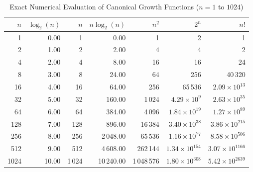 \documentclass[11pt,a4paper,oneside]{report}
\theoremstyle{definition}
\begin{document}
\begin{table}[htbp]
\centering
\caption{Exact Numerical Evaluation of Canonical Growth Functions ($n = 1$ to $1024$)}
\label{tab:numerical_growth_functions}
\small
\begin{tabular*}{\textwidth}{@{\extracolsep{\fill}}rrrrrrr}
\toprule
$n$ & $\log_2(n)$ & $n$ & $n \log_2(n)$ & $n^2$ & $2^n$ & $n!$ \\
\midrule
1    & 0.00  & 1     & 0.00     & 1           & 2                    & 1                    \\
2    & 1.00  & 2     & 2.00     & 4           & 4                    & 2                    \\
4    & 2.00  & 4     & 8.00     & 16          & 16                   & 24                   \\
8    & 3.00  & 8     & 24.00    & 64          & 256                  & 40\,320              \\
16   & 4.00  & 16    & 64.00    & 256         & 65\,536              & $2.09 \times 10^{13}$ \\
32   & 5.00  & 32    & 160.00   & 1\,024      & $4.29 \times 10^9$   & $2.63 \times 10^{35}$ \\
64   & 6.00  & 64    & 384.00   & 4\,096      & $1.84 \times 10^{19}$ & $1.27 \times 10^{89}$ \\
128  & 7.00  & 128   & 896.00   & 16\,384     & $3.40 \times 10^{38}$ & $3.86 \times 10^{215}$ \\
256  & 8.00  & 256   & 2\,048.00 & 65\,536    & $1.16 \times 10^{77}$ & $8.58 \times 10^{506}$ \\
512  & 9.00  & 512   & 4\,608.00 & 262\,144   & $1.34 \times 10^{154}$& $3.07 \times 10^{1166}$ \\
1024 & 10.00 & 1\,024& 10\,240.00& 1\,048\,576& $1.80 \times 10^{308}$& $5.42 \times 10^{2639}$ \\
\bottomrule
\end{tabular*}
\end{table}
\end{document}
